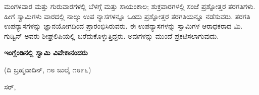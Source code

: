 ಮಂಗಳವಾರ ಮತ್ತು ಗುರುವಾರಗಳಲ್ಲಿ ಬೆಳಗ್ಗೆ ಮತ್ತು ಸಾಯಂಕಾಲ; ಶುಕ್ರವಾರಗಳಲ್ಲಿ ಸಂಜೆ ಪ್ರಶ್ನೋತ್ತರ ತರಗತಿಗಳು. ಹೀಗೆ ಸ್ವಾಮಿಗಳು ವಾರದಲ್ಲಿ ನಾಲ್ಕು ಉಪ ನ್ಯಾಸಗಳನ್ನೂ ಒಂದು ಪ್ರಶ್ನೋತ್ತರ ತರಗತಿಯನ್ನೂ ನಡೆಸುವರು. ತರಗತಿ ಉಪನ್ಯಾಸಗಳನ್ನು ಜ್ಞಾನಯೋಗದಿಂದ ಪ್ರಾರಂಭಿಸಿರುವರು. ಈ ಉಪನ್ಯಾಸಗಳನ್ನು ಸ್ವಾಮಿಗಳ ಆರಾಧಕರಾದ ಮಿ. ಗುಡ್ವಿನ್ ಅವರು ಶೀಘ್ರಲಿಪಿಯಲ್ಲಿ ಬರೆದುಕೊಳ್ಳುತ್ತಿದ್ದರು. ಅವುಗಳನ್ನು ಮುಂದೆ ಪ್ರಕಟಿಸಲಾಗುವುದು.

\begin{center}
\textbf{ಇಂಗ್ಲೆಂಡಿನಲ್ಲಿ ಸ್ವಾಮಿ ವಿವೇಕಾನಂದರು}
\end{center}

\begin{center}
(ದಿ ಬ್ರಹ್ಮವಾದಿನ್, ೧೮ ಜುಲೈ ೧೮೯೬)
\end{center}

ಸರ್,

